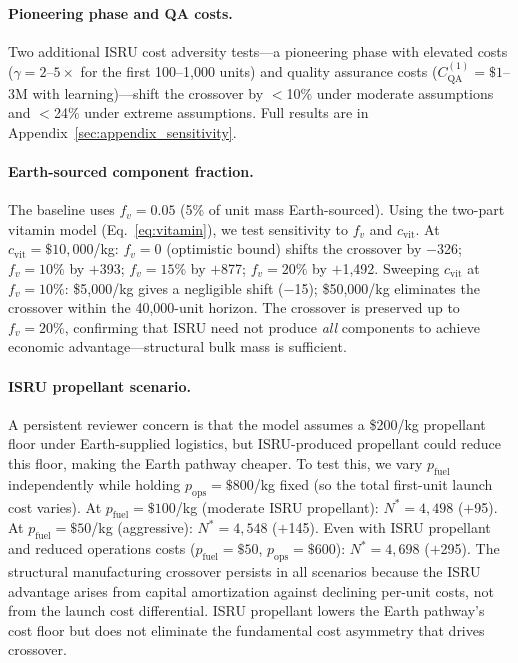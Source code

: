 \documentclass[preprint,12pt]{elsarticle}
\begin{document}
\paragraph{Pioneering phase and QA costs.} Two additional ISRU cost adversity tests---a pioneering phase with elevated costs ($\gamma = 2$--$5\times$ for the first 100--1{,}000 units) and quality assurance costs ($C_{\mathrm{QA}}^{(1)} = \$1$--$3$M with learning)---shift the crossover by $<$10\% under moderate assumptions and $<$24\% under extreme assumptions. Full results are in Appendix~\ref{sec:appendix_sensitivity}.

\paragraph{Earth-sourced component fraction.} The baseline uses $f_v = 0.05$ (5\% of unit mass Earth-sourced). Using the two-part vitamin model (Eq.~\ref{eq:vitamin}), we test sensitivity to $f_v$ and $c_{\mathrm{vit}}$. At $c_{\mathrm{vit}} = \$10{,}000$/kg: $f_v = 0$ (optimistic bound) shifts the crossover by $-$326; $f_v = 10\%$ by $+$393; $f_v = 15\%$ by $+$877; $f_v = 20\%$ by $+$1{,}492. Sweeping $c_{\mathrm{vit}}$ at $f_v = 10\%$: \$5{,}000/kg gives a negligible shift ($-$15); \$50{,}000/kg eliminates the crossover within the 40{,}000-unit horizon. The crossover is preserved up to $f_v = 20\%$, confirming that ISRU need not produce \emph{all} components to achieve economic advantage---structural bulk mass is sufficient.

\paragraph{ISRU propellant scenario.} A persistent reviewer concern is that the model assumes a \$200/kg propellant floor under Earth-supplied logistics, but ISRU-produced propellant could reduce this floor, making the Earth pathway cheaper. To test this, we vary $p_{\mathrm{fuel}}$ independently while holding $p_{\mathrm{ops}} = \$800$/kg fixed (so the total first-unit launch cost varies). At $p_{\mathrm{fuel}} = \$100$/kg (moderate ISRU propellant): $N^* = 4{,}498$ ($+$95). At $p_{\mathrm{fuel}} = \$50$/kg (aggressive): $N^* = 4{,}548$ ($+$145). Even with ISRU propellant and reduced operations costs ($p_{\mathrm{fuel}} = \$50$, $p_{\mathrm{ops}} = \$600$): $N^* = 4{,}698$ ($+$295). The structural manufacturing crossover persists in all scenarios because the ISRU advantage arises from capital amortization against declining per-unit costs, not from the launch cost differential. ISRU propellant lowers the Earth pathway's cost floor but does not eliminate the fundamental cost asymmetry that drives crossover.
\end{document}
